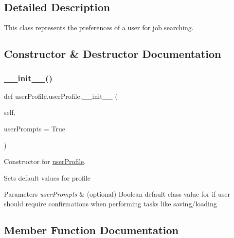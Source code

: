 \subsection{Detailed Description}
This class represents the preferences of a user for job searching. 

\subsection{Constructor \& Destructor Documentation}
\mbox{\label{classuserProfile_1_1userProfile_acc3074e2b18f583f4c29112dc8c7ac10}} 
\subsubsection{\texorpdfstring{\+\_\+\+\_\+init\+\_\+\+\_\+()}{\_\_init\_\_()}}
{\footnotesize\ttfamily def user\+Profile.\+user\+Profile.\+\_\+\+\_\+init\+\_\+\+\_\+ (\begin{DoxyParamCaption}\item[{}]{self,  }\item[{}]{user\+Prompts = {\ttfamily True} }\end{DoxyParamCaption})}



Constructor for \hyperlink{classuserProfile_1_1userProfile}{user\+Profile}. 

Sets default values for profile 
\begin{DoxyParams}{Parameters}
{\em user\+Prompts} & (optional) Boolean default class value for if user should require confirmations when performing tasks like saving/loading \\
\hline
\end{DoxyParams}


\subsection{Member Function Documentation}
\mbox{\label{classuserProfile_1_1userProfile_aa3806d54ee2f967e826537926e5aadf8}} 

